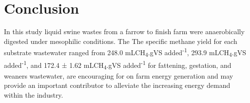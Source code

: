 \section{Conclusion}
In this study liquid swine wastes from a farrow to finish farm were anaerobically digested under mesophilic conditions. The The specific methane yield for each substrate wastewater ranged from 248.0 mLCH\textsubscript{4}.gVS added\textsuperscript{-1}, 293.9 mLCH\textsubscript{4}.gVS added\textsuperscript{-1}, and 172.4 ± 1.62 mLCH\textsubscript{4}.gVS added\textsuperscript{-1} for fattening, gestation, and weaners wastewater, are encouraging for on farm energy generation and may provide an important contributor to alleviate the increasing energy demand within the industry.